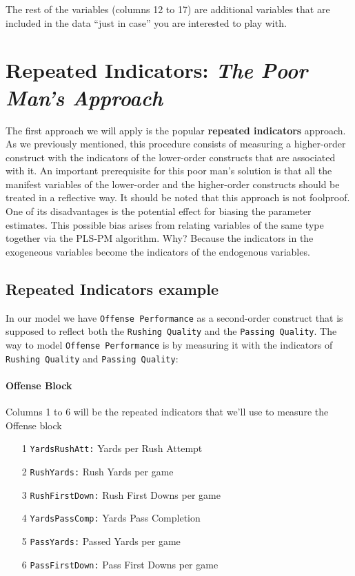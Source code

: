 \documentclass[12pt]{book}\usepackage{graphicx, color}
\newcommand{\code}[1]{\texttt{#1}}
\begin{document}
The rest of the variables (columns 12 to 17) are additional variables that are included in the data ``just in case'' you are interested to play with.




\section{Repeated Indicators: \textit{The Poor Man's Approach}}
The first approach we will apply is the popular \textbf{repeated indicators} approach. As we previously mentioned, this procedure consists of measuring a higher-order construct with the indicators of the lower-order constructs that are associated with it. An important prerequisite for this poor man's solution is that all the manifest variables of the lower-order and the higher-order constructs should be treated in a reflective way. It should be noted that this approach is not foolproof. One of its disadvantages is the potential effect for biasing the parameter estimates. This possible bias arises from relating variables of the same type together via the PLS-PM algorithm. Why? Because the indicators in the exogeneous variables become the indicators of the endogenous variables.

\subsection{Repeated Indicators example}
In our model we have \code{Offense Performance} as a second-order construct that is supposed to reflect both the \code{Rushing Quality} and the \code{Passing Quality}. The way to model \code{Offense Performance} is by measuring it with the indicators of \code{Rushing Quality} and \code{Passing Quality}:
\paragraph{Offense Block} Columns 1 to 6 will be the repeated indicators that we'll use to measure the Offense block
\begin{enumerate}
 \item[1] \code{YardsRushAtt:} Yards per Rush Attempt
 \item[2] \code{RushYards:} Rush Yards per game
 \item[3] \code{RushFirstDown:} Rush First Downs per game
 \item[4] \code{YardsPassComp:} Yards Pass Completion
 \item[5] \code{PassYards:} Passed Yards per game
 \item[6] \code{PassFirstDown:} Pass First Downs per game
\end{enumerate}
\end{document}
